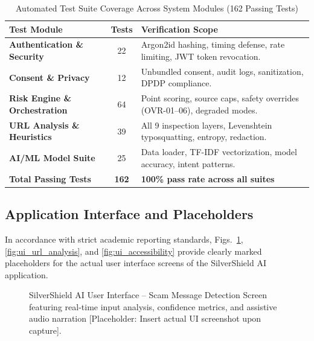 \documentclass[conference]{IEEEtran}
\begin{document}
\begin{table}[!t]
\centering
\caption{Automated Test Suite Coverage Across System Modules (162 Passing Tests)}
\label{tab:test_suite}
\begin{tabular}{|l|c|p{4.2cm}|}
\hline
\textbf{Test Module} & \textbf{Tests} & \textbf{Verification Scope} \\
\hline
\textbf{Authentication \& Security} & 22 & Argon2id hashing, timing defense, rate limiting, JWT token revocation. \\
\hline
\textbf{Consent \& Privacy} & 12 & Unbundled consent, audit logs, sanitization, DPDP compliance. \\
\hline
\textbf{Risk Engine \& Orchestration} & 64 & Point scoring, source caps, safety overrides (OVR-01--06), degraded modes. \\
\hline
\textbf{URL Analysis \& Heuristics} & 39 & All 9 inspection layers, Levenshtein typosquatting, entropy, redaction. \\
\hline
\textbf{AI/ML Model Suite} & 25 & Data loader, TF-IDF vectorization, model accuracy, intent patterns. \\
\hline
\hline
\textbf{Total Passing Tests} & \textbf{162} & \textbf{100\% pass rate across all suites} \\
\hline
\end{tabular}
\end{table}

\subsection{Application Interface and Placeholders}
In accordance with strict academic reporting standards, Figs.~\ref{fig:ui_scam_detector}, \ref{fig:ui_url_analysis}, and \ref{fig:ui_accessibility} provide clearly marked placeholders for the actual user interface screens of the SilverShield AI application.

\begin{figure}[!t]
\centering
{}
\caption{SilverShield AI User Interface -- Scam Message Detection Screen featuring real-time input analysis, confidence metrics, and assistive audio narration [Placeholder: Insert actual UI screenshot upon capture].}
\label{fig:ui_scam_detector}
\end{figure}
\end{document}
